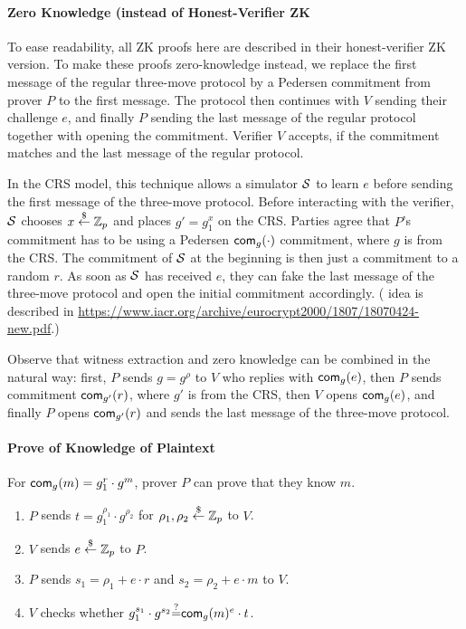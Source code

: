 \documentclass{article}
\begin{document}
\paragraph{Zero Knowledge (instead of Honest-Verifier ZK}
To ease readability, all  ZK proofs here are described in their
honest-verifier ZK version. To make these proofs zero-knowledge
instead, we replace the first message of the regular three-move protocol by a
Pedersen commitment from prover $P$ to the first message. The protocol
then continues with $V$ sending their challenge $e$, and finally $P$
sending the last message of the regular protocol together with opening
the commitment. Verifier $V$ accepts, if the commitment matches and
the last message of the regular protocol.

In the CRS model, this technique allows a simulator ${\mathcal{S}}$ to learn
$e$ before sending the first message of the three-move
protocol. Before interacting with the verifier, ${\mathcal{S}}$ chooses
$x\stackrel{\$}{\leftarrow}\mathbb{Z}_p$ and places $g'=g_1^x$ on the CRS. Parties agree that $P$'s
commitment has to be using a Pedersen $\mathsf{com}_g(\cdot)$ commitment,
where $g$ is from the CRS. The commitment of ${\mathcal{S}}$ at the beginning
is then just a commitment to a random $r$. As soon as ${\mathcal{S}}$ has
received $e$, they can fake the last message of the three-move
protocol and open the initial commitment accordingly.
( idea is
described in
\url{https://www.iacr.org/archive/eurocrypt2000/1807/18070424-new.pdf}.)

Observe that witness extraction and zero knowledge can be combined in
the natural way: first, $P$ sends $g=g^\rho$ to $V$ who replies with
$\mathsf{com}_g(e)$, then $P$ sends commitment $\mathsf{com}_{g'}(r)$, where $g'$ is
from the CRS, then $V$ opens $\mathsf{com}_g(e)$, and finally $P$ opens
$\mathsf{com}_{g'}(r)$ and sends the last message of the three-move protocol.

\paragraph{Prove of Knowledge of Plaintext}
For $\mathsf{com}_{g}(m)=g_1^r\cdot{}g^m$,  prover $P$ can prove that they know
$m$.

\begin{enumerate}
\item $P$ sends $t=g_1^{\rho_1}\cdot{}g^{\rho_2}$ for
  $\rho_1,\rho_2\stackrel{\$}{\leftarrow}\mathbb{Z}_p$ to $V$.
\item $V$ sends $e\stackrel{\$}{\leftarrow}\mathbb{Z}_p$ to $P$.
  \item $P$ sends $s_1=\rho_1+e\cdot{}r$ and $s_2=\rho_2+e\cdot{}m$ to
    $V$.
    \item $V$ checks whether $g_1^{s_1}\cdot{}g^{s_2}{\stackrel{?}{=}}\mathsf{com}_{g}(m)^e\cdot{}t$.
\end{enumerate}
\end{document}
